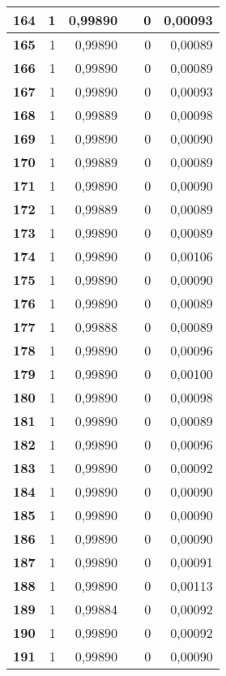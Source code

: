 {\begin{longtable}{|r|r|r|l|r|r|}
\textbf{164} & 1 & 0,99890 &  & 0 & 0,00093 \\ \hline
\textbf{165} & 1 & 0,99890 &  & 0 & 0,00089 \\ \hline
\textbf{166} & 1 & 0,99890 &  & 0 & 0,00089 \\ \hline
\textbf{167} & 1 & 0,99890 &  & 0 & 0,00093 \\ \hline
\textbf{168} & 1 & 0,99889 &  & 0 & 0,00098 \\ \hline
\textbf{169} & 1 & 0,99890 &  & 0 & 0,00090 \\ \hline
\textbf{170} & 1 & 0,99889 &  & 0 & 0,00089 \\ \hline
\textbf{171} & 1 & 0,99890 &  & 0 & 0,00090 \\ \hline
\textbf{172} & 1 & 0,99889 &  & 0 & 0,00089 \\ \hline
\textbf{173} & 1 & 0,99890 &  & 0 & 0,00089 \\ \hline
\textbf{174} & 1 & 0,99890 &  & 0 & 0,00106 \\ \hline
\textbf{175} & 1 & 0,99890 &  & 0 & 0,00090 \\ \hline
\textbf{176} & 1 & 0,99890 &  & 0 & 0,00089 \\ \hline
\textbf{177} & 1 & 0,99888 &  & 0 & 0,00089 \\ \hline
\textbf{178} & 1 & 0,99890 &  & 0 & 0,00096 \\ \hline
\textbf{179} & 1 & 0,99890 &  & 0 & 0,00100 \\ \hline
\textbf{180} & 1 & 0,99890 &  & 0 & 0,00098 \\ \hline
\textbf{181} & 1 & 0,99890 &  & 0 & 0,00089 \\ \hline
\textbf{182} & 1 & 0,99890 &  & 0 & 0,00096 \\ \hline
\textbf{183} & 1 & 0,99890 &  & 0 & 0,00092 \\ \hline
\textbf{184} & 1 & 0,99890 &  & 0 & 0,00090 \\ \hline
\textbf{185} & 1 & 0,99890 &  & 0 & 0,00090 \\ \hline
\textbf{186} & 1 & 0,99890 &  & 0 & 0,00090 \\ \hline
\textbf{187} & 1 & 0,99890 &  & 0 & 0,00091 \\ \hline
\textbf{188} & 1 & 0,99890 &  & 0 & 0,00113 \\ \hline
\textbf{189} & 1 & 0,99884 &  & 0 & 0,00092 \\ \hline
\textbf{190} & 1 & 0,99890 &  & 0 & 0,00092 \\ \hline
\textbf{191} & 1 & 0,99890 &  & 0 & 0,00090 \\ \hline

\end{longtable}}
